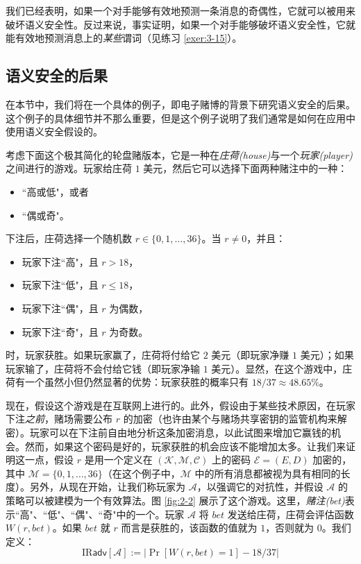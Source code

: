 我们已经表明，如果一个对手能够有效地预测一条消息的奇偶性，它就可以被用来破坏语义安全性。反过来说，事实证明，如果一个对手能够破坏语义安全性，它就能有效地预测消息上的\emph{某些}谓词（见练习 \ref{exer:3-15}）。

\subsection{语义安全的后果}\label{subsec:2-2-4}

在本节中，我们将在一个具体的例子，即电子赌博的背景下研究语义安全的后果。这个例子的具体细节并不那么重要，但是这个例子说明了我们通常是如何在应用中使用语义安全假设的。

考虑下面这个极其简化的轮盘赌版本，它是一种在\emph{庄荷(house)}与一个\emph{玩家(player)}之间进行的游戏。玩家给庄荷 $1$ 美元，然后它可以选择下面两种赌注中的一种：
\begin{itemize}
	\item ``高或低"，或者
	\item ``偶或奇"。
\end{itemize}
下注后，庄荷选择一个随机数 $r\in\{0,1,...,36\}$。当 $r\neq 0$，并且：
\begin{itemize}
	\item 玩家下注``高"，且 $r>18$，
	\item 玩家下注``低"，且 $r\leq18$，
	\item 玩家下注``偶"，且 $r$ 为偶数，
	\item 玩家下注``奇"，且 $r$ 为奇数。
\end{itemize}
时，玩家获胜。如果玩家赢了，庄荷将付给它 $2$ 美元（即玩家净赚 $1$ 美元）；如果玩家输了，庄荷将不会付给它钱（即玩家净输 $1$ 美元）。显然，在这个游戏中，庄荷有一个虽然小但仍然显著的优势：玩家获胜的概率只有 $18/37\approx48.65\%$。

现在，假设这个游戏是在互联网上进行的。此外，假设由于某些技术原因，在玩家下注\emph{之前}，赌场需要公布 $r$ 的加密（也许由某个与赌场共享密钥的监管机构来解密）。玩家可以在下注前自由地分析这条加密消息，以此试图来增加它赢钱的机会。然而，如果这个密码是好的，玩家获胜的机会应该不能增加太多。让我们来证明这一点，假设 $r$ 是用一个定义在 $(\mathcal{K},\mathcal{M},\mathcal{C})$ 上的密码 $\mathcal{E}=(E,D)$ 加密的，其中 $\mathcal{M}=\{0,1,\dots,36\}$（在这个例子中，$\mathcal{M}$ 中的所有消息都被视为具有相同的长度）。另外，从现在开始，让我们称玩家为 $\mathcal{A}$，以强调它的对抗性，并假设 $\mathcal{A}$ 的策略可以被建模为一个有效算法。图 \ref{fig:2-2} 展示了这个游戏。这里，\emph{赌注(bet)}表示``高"、``低"、``偶"、``奇"中的一个。玩家 $\mathcal{A}$ 将 $\mathit{bet}$ 发送给庄荷，庄荷会评估函数 $W(r,\mathit{bet})$。如果 $\mathit{bet}$ 就 $r$ 而言是获胜的，该函数的值就为 $1$，否则就为 $0$。我们定义：
\[
\mathrm{IR}\mathsf{adv}[\mathcal{A}]
:=
\big\lvert
\Pr[W(r,bet)=1]-18/37
\big\rvert
\]

